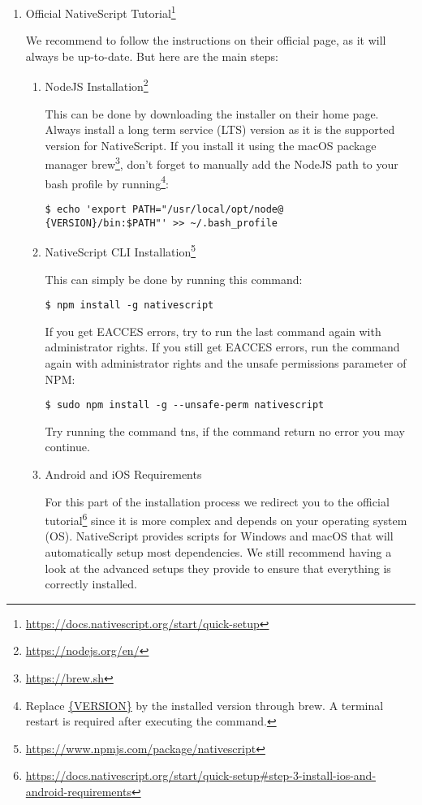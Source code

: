 \begin{enumerate}
\item Official NativeScript Tutorial\footnote{\url{https://docs.nativescript.org/start/quick-setup}}

We recommend to follow the instructions on their official page, as it will always be up-to-date. But here are the main steps:
\begin{enumerate}
\item NodeJS Installation\footnote{\url{https://nodejs.org/en/}}

This can be done by downloading the installer on their home page. Always install a long term service (LTS) version as it is the supported version for NativeScript. If you install it using the macOS package manager brew\footnote{\url{https://brew.sh}}, don't forget to manually add the NodeJS path to your bash profile by running\footnote{Replace \url{{VERSION}} by the installed version through brew. A terminal restart is required after executing the command.}:
\begin{lstlisting}
$ echo 'export PATH="/usr/local/opt/node@
{VERSION}/bin:$PATH"' >> ~/.bash_profile
\end{lstlisting}

\item NativeScript CLI Installation\footnote{\url{https://www.npmjs.com/package/nativescript}}

This can simply be done by running this command:
\begin{lstlisting}
$ npm install -g nativescript
\end{lstlisting}
If you get EACCES errors, try to run the last command again with administrator rights. If you still get EACCES errors, run the command again with administrator rights and the unsafe permissions parameter of NPM:
\begin{lstlisting}
$ sudo npm install -g --unsafe-perm nativescript
\end{lstlisting}
Try running the command tns, if the command return no error you may continue.

\item Android and iOS Requirements

For this part of the installation process we redirect you to the official tutorial\footnote{\url{https://docs.nativescript.org/start/quick-setup#step-3-install-ios-and-android-requirements}} since it is more complex and depends on your operating system (OS). NativeScript provides scripts for Windows and macOS that will automatically setup most dependencies. We still recommend having a look at the advanced setups they provide to ensure that everything is correctly installed.


\end{enumerate}
\end{enumerate}

